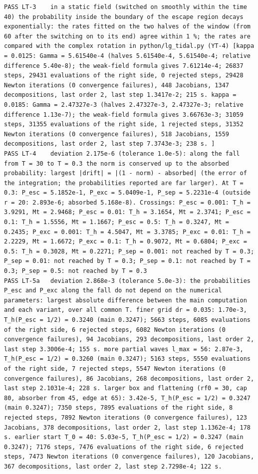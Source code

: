 \documentclass[
  10pt,
]{article}
\begin{document}
\begin{verbatim}
PASS LT-3    in a static field (switched on smoothly within the time 40) the probability inside the boundary of the escape region decays exponentially: the rates fitted on the two halves of the window (from 60 after the switching on to its end) agree within 1 %; the rates are compared with the complex rotation in python/lg_tidal.py (YT-4) [kappa = 0.0125: Gamma = 5.61540e-4 (halves 5.61540e-4, 5.61540e-4; relative difference 5.40e-8); the weak-field formula gives 7.61214e-4; 26837 steps, 29431 evaluations of the right side, 0 rejected steps, 29428 Newton iterations (0 convergence failures), 448 Jacobians, 1347 decompositions, last order 2, last step 1.3417e-2; 215 s. kappa = 0.0185: Gamma = 2.47327e-3 (halves 2.47327e-3, 2.47327e-3; relative difference 1.13e-7); the weak-field formula gives 3.66763e-3; 31059 steps, 31355 evaluations of the right side, 1 rejected steps, 31352 Newton iterations (0 convergence failures), 518 Jacobians, 1559 decompositions, last order 2, last step 7.3743e-3; 238 s. ]
PASS LT-4    deviation 2.175e-6 (tolerance 1.0e-5): along the fall from T = 30 to T = 0.3 the norm is conserved up to the absorbed probability: largest |drift| = |(1 - norm) - absorbed| (the error of the integration; the probabilities reported are far larger). At T = 0.3: P_esc = 5.1852e-1, P_exc = 5.0409e-1, P_sep = 5.2231e-4 (outside r = 20: 2.893e-6; absorbed 5.168e-8). Crossings: P_esc = 0.001: T_h = 3.9291, Mt = 2.9468; P_esc = 0.01: T_h = 3.1654, Mt = 2.3741; P_esc = 0.1: T_h = 1.5556, Mt = 1.1667; P_esc = 0.5: T_h = 0.3247, Mt = 0.2435; P_exc = 0.001: T_h = 4.5047, Mt = 3.3785; P_exc = 0.01: T_h = 2.2229, Mt = 1.6672; P_exc = 0.1: T_h = 0.9072, Mt = 0.6804; P_exc = 0.5: T_h = 0.3028, Mt = 0.2271; P_sep = 0.001: not reached by T = 0.3; P_sep = 0.01: not reached by T = 0.3; P_sep = 0.1: not reached by T = 0.3; P_sep = 0.5: not reached by T = 0.3
PASS LT-5a   deviation 2.868e-3 (tolerance 5.0e-3): the probabilities P_esc and P_exc along the fall do not depend on the numerical parameters: largest absolute difference between the main computation and each variant, over all common T. finer grid dr = 0.035: 1.70e-3, T_h(P_esc = 1/2) = 0.3240 (main 0.3247); 5663 steps, 6085 evaluations of the right side, 6 rejected steps, 6082 Newton iterations (0 convergence failures), 94 Jacobians, 293 decompositions, last order 2, last step 3.3006e-4; 155 s. more partial waves l_max = 56: 2.87e-3, T_h(P_esc = 1/2) = 0.3260 (main 0.3247); 5163 steps, 5550 evaluations of the right side, 7 rejected steps, 5547 Newton iterations (0 convergence failures), 86 Jacobians, 268 decompositions, last order 2, last step 2.1031e-4; 228 s. larger box and flattening (rf0 = 30, cap 80, absorber from 45, edge at 65): 3.42e-5, T_h(P_esc = 1/2) = 0.3247 (main 0.3247); 7350 steps, 7895 evaluations of the right side, 8 rejected steps, 7892 Newton iterations (0 convergence failures), 123 Jacobians, 378 decompositions, last order 2, last step 1.1362e-4; 178 s. earlier start T_0 = 40: 5.03e-5, T_h(P_esc = 1/2) = 0.3247 (main 0.3247); 7176 steps, 7476 evaluations of the right side, 6 rejected steps, 7473 Newton iterations (0 convergence failures), 120 Jacobians, 367 decompositions, last order 2, last step 2.7298e-4; 122 s. 

\end{verbatim}
\end{document}
